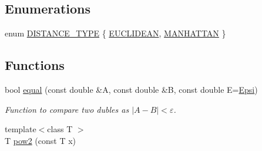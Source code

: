 \subsection*{Enumerations}
\begin{DoxyCompactItemize}
\item 
enum \mbox{\hyperlink{maths_8hh_ac50d7263b1cae8691420b86282b27f90}{D\+I\+S\+T\+A\+N\+C\+E\+\_\+\+T\+Y\+PE}} \{ \mbox{\hyperlink{maths_8hh_ac50d7263b1cae8691420b86282b27f90a81bbbc4428c3ff3f1327e94957e2b5f1}{E\+U\+C\+L\+I\+D\+E\+AN}}, 
\mbox{\hyperlink{maths_8hh_ac50d7263b1cae8691420b86282b27f90a9ae95b5995796e7e5f32fa482a5bff98}{M\+A\+N\+H\+A\+T\+T\+AN}}
 \}
\end{DoxyCompactItemize}
\subsection*{Functions}
\begin{DoxyCompactItemize}
\item 
bool \mbox{\hyperlink{maths_8hh_a24e66125d5c9aea6608f537bdf77841e}{equal}} (const double \&A, const double \&B, const double E=\mbox{\hyperlink{maths_8hh_a78802b279ab85021d7f6bffe51621703}{Epsi}})
\begin{DoxyCompactList}\small\item\em Function to compare two dubles as $\vert A-B\vert < \varepsilon$. \end{DoxyCompactList}\item 
{\footnotesize template$<$class T $>$ }\\T \mbox{\hyperlink{maths_8hh_a054f7427a96b10baa550060a0376584c}{pow2}} (const T x)
\end{DoxyCompactItemize}

